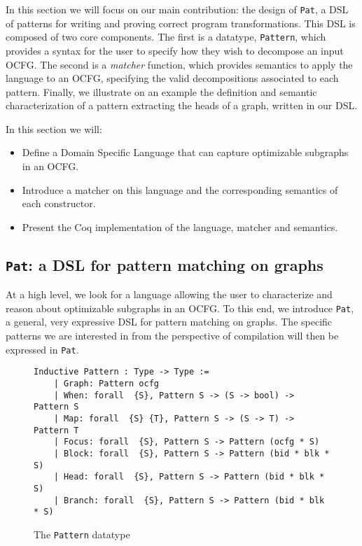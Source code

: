\documentclass[11pt]{article}
\newcommand{\inlinecoq}[1]{\mbox{\lstinline[style=customcoq,columns=fixed,basewidth=.48em]{#1}}}
\newcommand{\ilc}[1]{\inlinecoq{#1}}
\newcommand{\yzt}[1]{\textcolor{ForestGreen!50}{#1}}
\newcommand{\cut}[1]{\textcolor{Gray!40}{#1}}
\newcommand{\ocfg}{OCFG\xspace}
\newcommand{\pat}{\texttt{Pat}\xspace}
\begin{document}
In this section we will focus on our main contribution: the design of \pat{}, a DSL of patterns for writing and proving correct program transformations. This DSL is composed of two core components. The first is a datatype, \ilc{Pattern}, which provides a syntax for the user to specify how they wish to decompose an input \ocfg. The second is a \emph{matcher} function, which provides semantics to apply the language to an \ocfg{}, specifying the valid decompositions associated to each pattern. Finally, we illustrate on an example the definition and semantic characterization of a pattern extracting the heads of a graph, written in our DSL\@.

\cut{
In this section we will:\begin{itemize}
  \item Define a Domain Specific Language that can capture optimizable subgraphs in an \ocfg\@.
  \item Introduce a matcher on this language and the corresponding semantics of each constructor.
  \item Present the Coq implementation of the language, matcher and semantics.
\end{itemize}
}

\subsection{\pat: a DSL for pattern matching on graphs}

\yzt{At a high level, we look for a language allowing the user to characterize and reason about optimizable subgraphs in an \ocfg. 
To this end, we introduce \pat, a general, very expressive DSL for pattern matching on graphs. The specific patterns we are interested in from the perspective of compilation will then be expressed in \pat.}

\begin{figure}
  \begin{lstlisting}[style=customcoq,basicstyle=\small\ttfamily]
    Inductive Pattern : Type -> Type :=
    | Graph: Pattern ocfg
    | When: forall  {S}, Pattern S -> (S -> bool) -> Pattern S
    | Map: forall  {S} {T}, Pattern S -> (S -> T) -> Pattern T
    | Focus: forall  {S}, Pattern S -> Pattern (ocfg * S)
    | Block: forall  {S}, Pattern S -> Pattern (bid * blk * S)
    | Head: forall  {S}, Pattern S -> Pattern (bid * blk * S)
    | Branch: forall  {S}, Pattern S -> Pattern (bid * blk * S)
  \end{lstlisting}
  \caption{The \ilc{Pattern} datatype}
  \label{fig:pat}
\end{figure}
\end{document}

